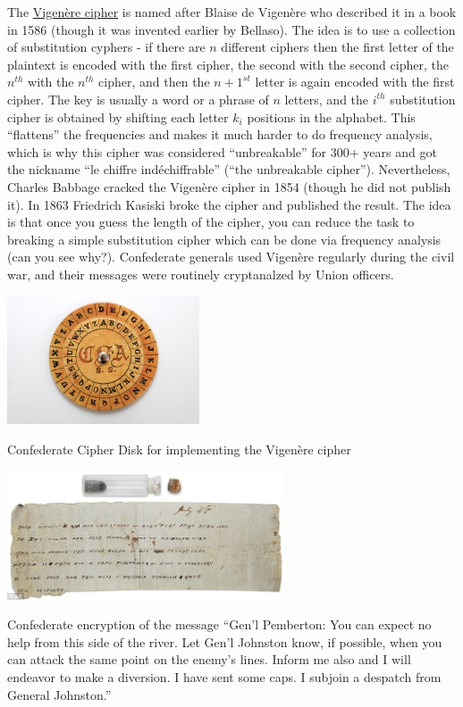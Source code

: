 The \href{https://en.wikipedia.org/wiki/Vigen\%C3\%A8re_cipher}{Vigenère
cipher} is named after Blaise de Vigenère who described it in a book in
1586 (though it was invented earlier by Bellaso). The idea is to use a
collection of substitution cyphers - if there are \(n\) different
ciphers then the first letter of the plaintext is encoded with the first
cipher, the second with the second cipher, the \(n^{th}\) with the
\(n^{th}\) cipher, and then the \(n+1^{st}\) letter is again encoded
with the first cipher. The key is usually a word or a phrase of \(n\)
letters, and the \(i^{th}\) substitution cipher is obtained by shifting
each letter \(k_i\) positions in the alphabet. This ``flattens'' the
frequencies and makes it much harder to do frequency analysis, which is
why this cipher was considered ``unbreakable'' for 300+ years and got
the nickname ``le chiffre indéchiffrable'' (``the unbreakable cipher'').
Nevertheless, Charles Babbage cracked the Vigenère cipher in 1854
(though he did not publish it). In 1863 Friedrich Kasiski broke the
cipher and published the result. The idea is that once you guess the
length of the cipher, you can reduce the task to breaking a simple
substitution cipher which can be done via frequency analysis (can you
see why?). Confederate generals used Vigenère regularly during the civil
war, and their messages were routinely cryptanalzed by Union officers.


\begin{marginfigure}
\centering
\includegraphics[width=\linewidth, height=1.5in, keepaspectratio]{../figure/confederate_cipher_disk.jpg}
\caption{Confederate Cipher Disk for implementing the Vigenère cipher}
\label{tmplabelfig}
\end{marginfigure}


\begin{marginfigure}
\centering
\includegraphics[width=\linewidth, height=1.5in, keepaspectratio]{../figure/confederate_message.jpg}
\caption{Confederate encryption of the message ``Gen'l Pemberton: You
can expect no help from this side of the river. Let Gen'l Johnston know,
if possible, when you can attack the same point on the enemy's lines.
Inform me also and I will endeavor to make a diversion. I have sent some
caps. I subjoin a despatch from General Johnston.''}
\label{tmplabelfig}
\end{marginfigure}

